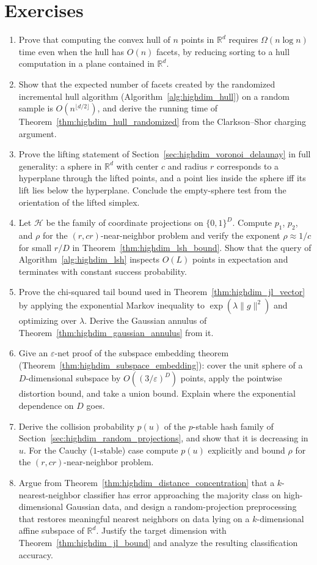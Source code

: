 \section{Exercises}
\label{sec:highdim_exercises}

\begin{enumerate}
\item Prove that computing the convex hull of $n$ points in $\mathbb{R}^d$
requires $\Omega(n \log n)$ time even when the hull has $O(n)$ facets, by
reducing sorting to a hull computation in a plane contained in
$\mathbb{R}^d$.
\item Show that the expected number of facets created by the
randomized incremental hull algorithm (Algorithm~\ref{alg:highdim_hull}) on a
random sample is $O(n^{\lfloor d/2 \rfloor})$, and derive the running time of
Theorem~\ref{thm:highdim_hull_randomized} from the Clarkson--Shor charging
argument.
\item Prove the lifting statement of Section~\ref{sec:highdim_voronoi_delaunay}
in full generality: a sphere in $\mathbb{R}^d$ with center $c$ and radius $r$
corresponds to a hyperplane through the lifted points, and a point lies inside
the sphere iff its lift lies below the hyperplane. Conclude the empty-sphere
test from the orientation of the lifted simplex.
\item Let $\mathcal{H}$ be the family of coordinate projections on
$\{0,1\}^D$. Compute $p_1$, $p_2$, and $\rho$ for the $(r, cr)$-near-neighbor
problem and verify the exponent $\rho \approx 1/c$ for small $r/D$ in
Theorem~\ref{thm:highdim_lsh_bound}. Show that the query of
Algorithm~\ref{alg:highdim_lsh} inspects $O(L)$ points in expectation and
terminates with constant success probability.
\item Prove the chi-squared tail bound used in
Theorem~\ref{thm:highdim_jl_vector} by applying the exponential Markov
inequality to $\exp(\lambda \|g\|^2)$ and optimizing over $\lambda$. Derive
the Gaussian annulus of Theorem~\ref{thm:highdim_gaussian_annulus} from it.
\item Give an $\varepsilon$-net proof of the subspace embedding theorem
(Theorem~\ref{thm:highdim_subspace_embedding}): cover the unit sphere of a
$D$-dimensional subspace by $O((3/\varepsilon)^D)$ points, apply the
pointwise distortion bound, and take a union bound. Explain where the
exponential dependence on $D$ goes.
\item Derive the collision probability $p(u)$ of the $p$-stable hash family
of Section~\ref{sec:highdim_random_projections}, and show that it is
decreasing in $u$. For the Cauchy ($1$-stable) case compute $p(u)$ explicitly
and bound $\rho$ for the $(r, cr)$-near-neighbor problem.
\item Argue from Theorem~\ref{thm:highdim_distance_concentration} that a
$k$-nearest-neighbor classifier has error approaching the majority class on
high-dimensional Gaussian data, and design a random-projection
preprocessing that restores meaningful nearest neighbors on data lying on a
$k$-dimensional affine subspace of $\mathbb{R}^d$. Justify the target
dimension with Theorem~\ref{thm:highdim_jl_bound} and analyze the resulting
classification accuracy.
\end{enumerate}
